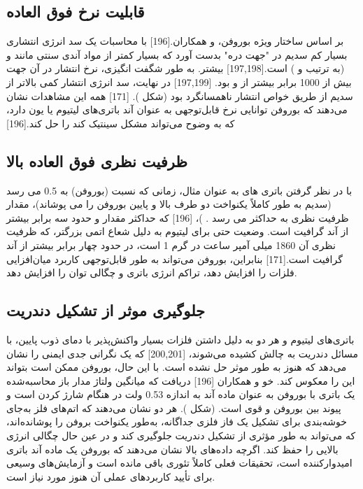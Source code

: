 \subsection{قابلیت نرخ فوق العاده}
بر اساس ساختار ویژه بوروفن،  و همکاران.[196] با محاسبات  یک سد انرژی انتشاری بسیار کم  سدیم در "جهت دره" بدست آورد که بسیار کمتر از مواد آندی سنتی مانند  و  (به ترتیب  و ) است.[197,198] بیشتر. به طور شگفت انگیزی، نرخ انتشار در آن جهت بیش از 1000 برابر بیشتر از  و  بود. [197,199] در نهایت، سد انرژی انتشار  کمی بالاتر از سدیم از طریق خواص انتشار ناهمسانگرد بود (شکل ). [171] همه این مشاهدات نشان می‌دهند که بوروفن توانایی نرخ قابل‌توجهی به عنوان آند باتری‌های لیتیوم یا یون دارد، که به وضوح می‌تواند مشکل سینتیک کند را حل کند.[196]
\subsection{ظرفیت نظری فوق العاده بالا}
با در نظر گرفتن باتری های  به عنوان مثال، زمانی که نسبت  (بوروفن) به 0.5 می رسد (سدیم به طور کاملاً یکنواخت دو طرف بالا و پایین بوروفن را می پوشاند)، مقدار ظرفیت نظری به حداکثر می رسد . )، [196] که حداکثر مقدار و حدود سه برابر بیشتر از آند گرافیت  است. وضعیت حتی برای لیتیوم  به دلیل شعاع اتمی بزرگتر، که ظرفیت نظری آن 1860 میلی آمپر ساعت در گرم 1 است، در حدود چهار برابر بیشتر از آند گرافیت است.[171] بنابراین، بوروفن می‌تواند به طور قابل‌توجهی کاربرد میان‌افزایی فلزات را افزایش دهد، تراکم انرژی باتری و چگالی توان را افزایش دهد.

\subsection{جلوگیری موثر از تشکیل دندریت}
باتری‌های لیتیوم و  هر دو به دلیل داشتن فلزات بسیار واکنش‌پذیر با دمای ذوب پایین، با مسائل دندریت به چالش کشیده می‌شوند، [200,201] که یک نگرانی جدی ایمنی را نشان می‌دهد که هنوز به طور موثر حل نشده است. با این حال، بوروفن ممکن است بتواند این را معکوس کند. خو و همکاران [196] دریافت که میانگین ولتاژ مدار باز محاسبه‌شده یک باتری  با بوروفن به عنوان ماده آند به اندازه 0.53 ولت در هنگام شارژ کردن است و پیوند بین بوروفن و  قوی است. (شکل ). هر دو نشان می‌دهند که اتم‌های فلز به‌جای خوشه‌بندی برای تشکیل یک فاز فلزی جداگانه، به‌طور یکنواخت بروفن را پوشانده‌اند، که می‌تواند به طور مؤثری از تشکیل دندریت جلوگیری کند و در عین حال چگالی انرژی بالایی را حفظ کند. اگرچه داده‌های بالا نشان می‌دهند که بوروفن یک ماده آند باتری امیدوارکننده است، تحقیقات فعلی کاملاً تئوری باقی مانده است و آزمایش‌های وسیعی برای تأیید کاربردهای عملی آن هنوز مورد نیاز است.
